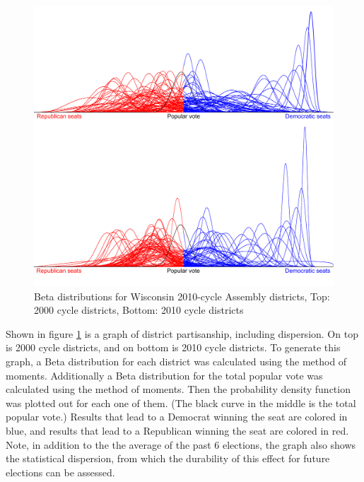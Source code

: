 \documentclass[preprint,12pt]{article}
\begin{document}
\begin{figure}[htb!]
    \begin{center}
        \includegraphics[scale=0.25]{../Figures/WI_compared/Betas_cropped.png}
        \caption{Beta distributions for Wisconsin 2010-cycle Assembly districts, Top: 2000 cycle districts, Bottom: 2010 cycle districts}\label{fig:Betas}
    \end{center}
\end{figure}
 
Shown in figure \ref{fig:Betas} is a graph of district partisanship, including dispersion.  On top is 2000 cycle districts, and on bottom is 2010 cycle districts.   To generate this graph, a Beta distribution for each district was calculated using the method of moments.  Additionally a Beta distribution for the total popular vote was calculated using the method of moments.  Then the probability density function was plotted out for each one of them.  (The black curve in the middle is the total popular vote.) Results that lead to a Democrat winning the seat are colored in blue, and results that lead to a Republican winning the seat are colored in red.
Note, in addition to the the average of the past 6 elections, the graph also shows the statistical dispersion, from which the durability of this effect for future elections can be assessed.
\end{document}
